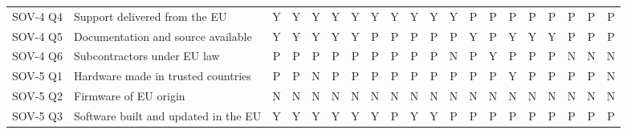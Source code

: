 \begin{table}[p]
\begin{tabular}{@{}l l *{18}{c}@{}}
SOV-4 Q4 & Support delivered from the EU & \cellcolor{green!22}Y & \cellcolor{green!22}Y & \cellcolor{green!22}Y & \cellcolor{green!22}Y & \cellcolor{green!22}Y & \cellcolor{green!22}Y & \cellcolor{green!22}Y & \cellcolor{green!22}Y & \cellcolor{green!22}Y & \cellcolor{green!22}Y & \cellcolor{orange!25}P & \cellcolor{orange!25}P & \cellcolor{orange!25}P & \cellcolor{orange!25}P & \cellcolor{orange!25}P & \cellcolor{orange!25}P & \cellcolor{orange!25}P & \cellcolor{orange!25}P \\
SOV-4 Q5 & Documentation and source available & \cellcolor{green!22}Y & \cellcolor{green!22}Y & \cellcolor{green!22}Y & \cellcolor{green!22}Y & \cellcolor{green!22}Y & \cellcolor{orange!25}P & \cellcolor{orange!25}P & \cellcolor{orange!25}P & \cellcolor{orange!25}P & \cellcolor{orange!25}P & \cellcolor{green!22}Y & \cellcolor{orange!25}P & \cellcolor{green!22}Y & \cellcolor{green!22}Y & \cellcolor{green!22}Y & \cellcolor{orange!25}P & \cellcolor{orange!25}P & \cellcolor{orange!25}P \\
SOV-4 Q6 & Subcontractors under EU law & \cellcolor{orange!25}P & \cellcolor{orange!25}P & \cellcolor{orange!25}P & \cellcolor{orange!25}P & \cellcolor{orange!25}P & \cellcolor{orange!25}P & \cellcolor{orange!25}P & \cellcolor{orange!25}P & \cellcolor{orange!25}P & \cellcolor{red!25}N & \cellcolor{orange!25}P & \cellcolor{green!22}Y & \cellcolor{orange!25}P & \cellcolor{orange!25}P & \cellcolor{orange!25}P & \cellcolor{red!25}N & \cellcolor{red!25}N & \cellcolor{red!25}N \\
\midrule
SOV-5 Q1 & Hardware made in trusted countries & \cellcolor{orange!25}P & \cellcolor{orange!25}P & \cellcolor{red!25}N & \cellcolor{orange!25}P & \cellcolor{orange!25}P & \cellcolor{orange!25}P & \cellcolor{orange!25}P & \cellcolor{orange!25}P & \cellcolor{orange!25}P & \cellcolor{orange!25}P & \cellcolor{orange!25}P & \cellcolor{orange!25}P & \cellcolor{green!22}Y & \cellcolor{orange!25}P & \cellcolor{orange!25}P & \cellcolor{orange!25}P & \cellcolor{orange!25}P & \cellcolor{red!25}N \\
SOV-5 Q2 & Firmware of EU origin & \cellcolor{red!25}N & \cellcolor{red!25}N & \cellcolor{red!25}N & \cellcolor{red!25}N & \cellcolor{red!25}N & \cellcolor{red!25}N & \cellcolor{red!25}N & \cellcolor{red!25}N & \cellcolor{red!25}N & \cellcolor{red!25}N & \cellcolor{red!25}N & \cellcolor{red!25}N & \cellcolor{red!25}N & \cellcolor{red!25}N & \cellcolor{red!25}N & \cellcolor{red!25}N & \cellcolor{red!25}N & \cellcolor{red!25}N \\
SOV-5 Q3 & Software built and updated in the EU & \cellcolor{green!22}Y & \cellcolor{green!22}Y & \cellcolor{green!22}Y & \cellcolor{green!22}Y & \cellcolor{green!22}Y & \cellcolor{green!22}Y & \cellcolor{orange!25}P & \cellcolor{green!22}Y & \cellcolor{green!22}Y & \cellcolor{orange!25}P & \cellcolor{orange!25}P & \cellcolor{orange!25}P & \cellcolor{orange!25}P & \cellcolor{orange!25}P & \cellcolor{orange!25}P & \cellcolor{orange!25}P & \cellcolor{orange!25}P & \cellcolor{orange!25}P \\

\end{tabular}
\end{table}
